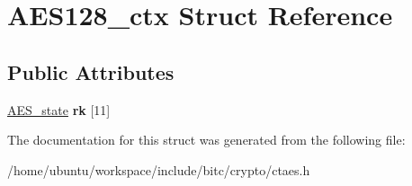 \hypertarget{structAES128__ctx}{\section{A\-E\-S128\-\_\-ctx Struct Reference}
\label{structAES128__ctx}
}
\subsection*{Public Attributes}
\begin{DoxyCompactItemize}
\item 
\hypertarget{structAES128__ctx_abbeaa43481859ca3558ecc9ebc8784fe}{\hyperlink{structAES__state}{A\-E\-S\-\_\-state} {\bfseries rk} \mbox{[}11\mbox{]}}\label{structAES128__ctx_abbeaa43481859ca3558ecc9ebc8784fe}

\end{DoxyCompactItemize}


The documentation for this struct was generated from the following file\-:\begin{DoxyCompactItemize}
\item 
/home/ubuntu/workspace/include/bitc/crypto/ctaes.\-h\end{DoxyCompactItemize}
